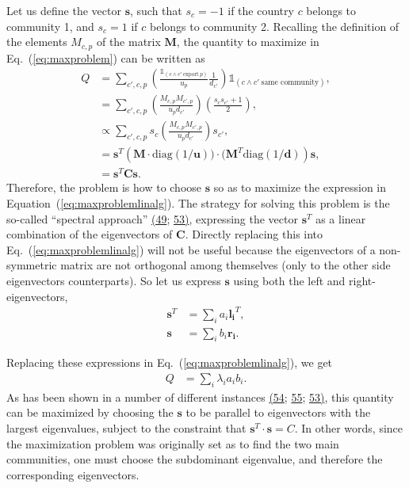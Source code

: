 \documentclass{pnastwo}
\newcommand{\mtx}[1]{\mathbf{ #1}}
\newcommand{\diag}[1]{\mathrm{diag}\left( #1\right)}
\renewcommand{\vec}[1]{\mathbf{#1}}
\begin{document}
\begin{article}
Let us define the vector $\vec{s}$, such that $s_c=-1$ if the country $c$ belongs to community 1, and $s_c=1$ if $c$ belongs to community 2. Recalling the definition of the elements $M_{c,p}$ of the matrix $\mtx{M}$, the quantity to maximize in Eq.~(\ref{eq:maxproblem}) can be written as
\begin{align}
    Q&=\sum_{c',c,p} \left(\frac{\mathbb{1}_{(c\wedge c'~\text{export}~p)} }{u_p}\frac{1}{d_{c'}}\right)\mathbb{1}_{(c\wedge c'~\text{same community})}, \nonumber\\
    &=\sum_{c',c,p} \left(\frac{M_{c,p}M_{c',p} }{u_p d_{c'}}\right)\left(\frac{s_{c}s_{c'}+1}{2}\right), \nonumber\\
    &\propto \sum_{c',c,p} s_{c}\left(\frac{M_{c,p}M_{c',p} }{u_p d_{c'}}\right)s_{c'}, \nonumber\\
    &= \vec{s}^T \left(\mtx{M}\cdot\diag{1/\vec{u}})\cdot(\mtx{M}^T\diag{1/\vec{d}}\right) \vec{s}, \nonumber\\
    &=\vec{s}^T \mtx{C} \vec{s}. \label{eq:maxproblemlinalg}
\end{align}
Therefore, the problem is how to choose $\vec{s}$ so as to maximize the expression in Equation~(\ref{eq:maxproblemlinalg}). The strategy for solving this problem is the so-called ``spectral approach'' \hyperref[csl:49]{(49}; \hyperref[csl:53]{53)}, expressing the vector $\vec{s}^T$ as a linear combination of the eigenvectors of $\mtx{C}$. Directly replacing this into Eq.~(\ref{eq:maxproblemlinalg}) will not be useful because the eigenvectors of a non-symmetric matrix are not orthogonal among themselves (only to the other side eigenvectors counterparts). So let us express $\vec{s}$ using both the left and right-eigenvectors, 
\begin{align}
    \vec{s}^T&=\sum_i a_i \vec{l_i}^T, \nonumber\\
    \vec{s}&=\sum_i b_i \vec{r_i}.
\end{align}

Replacing these expressions in Eq.~(\ref{eq:maxproblemlinalg}), we get
\begin{align}
    Q&=\sum_i \lambda_i a_i b_i. 
\end{align}
As has been shown in a number of different instances \hyperref[csl:54]{(54}; \hyperref[csl:55]{55}; \hyperref[csl:53]{53)}, this quantity can be maximized by choosing the $\vec{s}$ to be parallel to eigenvectors with the largest eigenvalues, subject to the constraint that $\vec{s}^T\cdot\vec{s}=C$. In other words, since the maximization problem was originally set as to find the two main communities, one must choose the subdominant eigenvalue, and therefore the corresponding eigenvectors.






\end{article}
\end{document}
